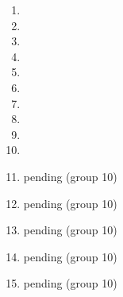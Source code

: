 \documentclass[12pt]{article}
\begin{document}
\begin{enumerate}
    \item 
    \item 
    \item 
    \item 
    \item 
    
    \item 
    \item 
    \item  
    \item 
    \item 
    
    \item pending (group 10)
    \item pending (group 10)
    \item pending (group 10)
    \item pending (group 10)
    \item pending (group 10)
\end{enumerate}
\end{document}
